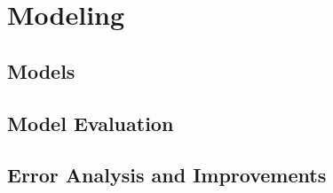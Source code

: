 \chapter{Modeling}

\section{Models}

\section{Model Evaluation}

\section{Error Analysis and Improvements}

